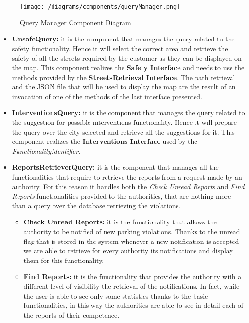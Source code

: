 			\begin{figure}[ht]
				\centering
				\texttt{[image: /diagrams/components/queryManager.png]}
				\caption{\label{fig:queryManagerComp} Query Manager Component Diagram}
			\end{figure}
		
			\begin{itemize}
				\item \textbf{UnsafeQuery:} it is the component that manages the query related to the safety functionality. Hence it will select the correct area and retrieve the safety of all the streets required by the customer as they can be displayed on the map. This component realizes the \textbf{Safety Interface} and needs to use the methods provided by the \textbf{StreetsRetrieval Interface}. The path retrieval and the JSON file that will be used to display the map are the result of an invocation of one of the methods of the last interface presented.
				
				\item \textbf{InterventionsQuery:} it is the component that manages the query related to the suggestion for possible interventions functionality. Hence it will prepare the query over the city selected and retrieve all the suggestions for it. This component realizes the \textbf{Interventions Interface} used by the \emph{FunctionalityIdentifier}.
				
				\item \textbf{ReportsRetrieverQuery:} it is the component that manages all the functionalities that require to retrieve the reports from a request made by an authority. For this reason it handles both the \emph{Check Unread Reports} and \emph{Find Reports} functionalities provided to the authorities, that are nothing more than a query over the database retrieving the violations. 
				
				\begin{itemize}
					\item \textbf{Check Unread Reports:} it is the functionality that allows the authority to be notified of new parking violations. Thanks to the unread flag that is stored in the system whenever a new notification is accepted we are able to retrieve for every authority its notifications and display them for this functionality.
					
					\item \textbf{Find Reports:} it is the functionality that provides the authority with a different level of visibility the retrieval of the notifications. In fact, while the user is able to see only some statistics thanks to the basic functionalities, in this way the authorities are able to see in detail each of the reports of their competence.
				\end{itemize}
			

\end{itemize}
